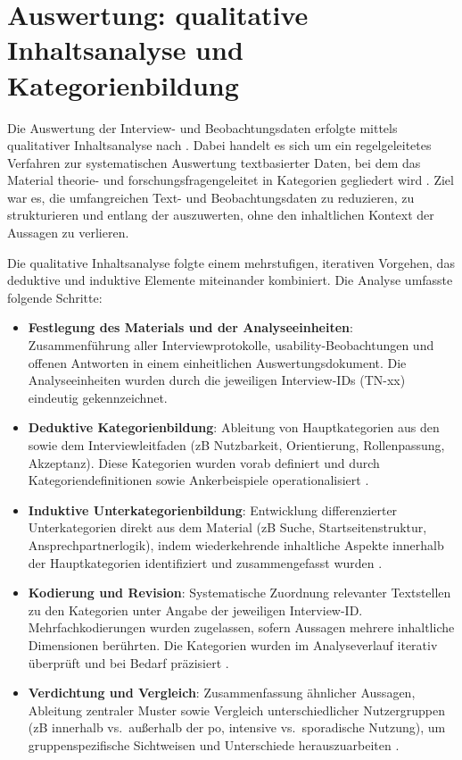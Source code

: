 \section{Auswertung: qualitative Inhaltsanalyse und Kategorienbildung}
\label{sec:04-03_content-analysis}

Die Auswertung der Interview- und Beobachtungsdaten erfolgte mittels qualitativer Inhaltsanalyse nach \citeauthor{421:Mayring2022} \cite{421:Mayring2022}. Dabei handelt es sich um ein regelgeleitetes Verfahren zur systematischen Auswertung textbasierter Daten, bei dem das Material theorie- und forschungsfragengeleitet in Kategorien gegliedert wird \cite{120:Mayring2014}. Ziel war es, die umfangreichen Text- und Beobachtungsdaten zu reduzieren, zu strukturieren und entlang der  auszuwerten, ohne den inhaltlichen Kontext der Aussagen zu verlieren.

Die qualitative Inhaltsanalyse folgte einem mehrstufigen, iterativen Vorgehen, das deduktive und induktive Elemente miteinander kombiniert. Die Analyse umfasste folgende Schritte:
\begin{itemize}
    \item \textbf{Festlegung des Materials und der Analyseeinheiten}: Zusammenführung aller Interviewprotokolle, \Gls{usability}-Beobachtungen und offenen Antworten in einem einheitlichen Auswertungsdokument. Die Analyseeinheiten wurden durch die jeweiligen Interview-IDs (TN-xx) eindeutig gekennzeichnet.
    \item \textbf{Deduktive Kategorienbildung}: Ableitung von Hauptkategorien aus den  sowie dem Interviewleitfaden (\acrshort{zB} Nutzbarkeit, Orientierung, Rollenpassung, Akzeptanz). Diese Kategorien wurden vorab definiert und durch Kategoriendefinitionen sowie Ankerbeispiele operationalisiert \cite{421:Mayring2022}.
    \item \textbf{Induktive Unterkategorienbildung}: Entwicklung differenzierter Unterkategorien direkt aus dem Material (\acrshort{zB} Suche, Startseitenstruktur, Ansprechpartnerlogik), indem wiederkehrende inhaltliche Aspekte innerhalb der Hauptkategorien identifiziert und zusammengefasst wurden \cite{120:Mayring2014,122:Mayring2019}.
    \item \textbf{Kodierung und Revision}: Systematische Zuordnung relevanter Textstellen zu den Kategorien unter Angabe der jeweiligen Interview-ID. Mehrfachkodierungen wurden zugelassen, sofern Aussagen mehrere inhaltliche Dimensionen berührten. Die Kategorien wurden im Analyseverlauf iterativ überprüft und bei Bedarf präzisiert \cite{421:Mayring2022}.
    \item \textbf{Verdichtung und Vergleich}: Zusammenfassung ähnlicher Aussagen, Ableitung zentraler Muster sowie Vergleich unterschiedlicher Nutzergruppen (\acrshort{zB} innerhalb vs.\ außerhalb der \acrshort{po}, intensive vs.\ sporadische Nutzung), um gruppenspezifische Sichtweisen und Unterschiede herauszuarbeiten \cite{422:Flick2018}.
\end{itemize}

